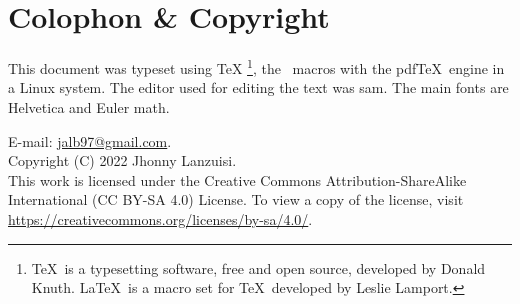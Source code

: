 \pagebreak
\section*{Colophon \& Copyright}
This document was typeset using \TeX%
\footnote{%
    \TeX\ is
    a typesetting software, free and open source,
    developed by Donald Knuth. \LaTeX\ is a macro
    set for \TeX\ developed by Leslie Lamport.
},
the \LaTeXe\ macros with the pdf\TeX\ engine in a Linux system.
The editor used for editing the text was sam.
The main fonts are Helvetica and Euler math.

\begingroup\small
\medskip
%
\noindent E-mail: \url{jalb97@gmail.com}. \\
Copyright (C) 2022 Jhonny Lanzuisi. \\
This work is licensed under the Creative Commons Attri\-bu\-tion-Sha\-re\-Alike
International (CC BY-SA 4.0)  License. To view a copy of the li\-cense,
visit \url{https://creativecommons.org/licenses/by-sa/4.0/}.
\endgroup
